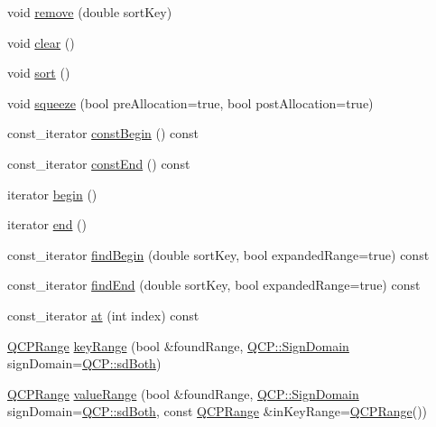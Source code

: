 \begin{DoxyCompactItemize}
\item 
void \hyperlink{class_q_c_p_data_container_a2dbded7f0732bacf9db48fdfbbb620bc}{remove} (double sort\+Key)
\item 
void \hyperlink{class_q_c_p_data_container_a7e2b29736c6fd761649bda1a54ba967f}{clear} ()
\item 
void \hyperlink{class_q_c_p_data_container_a75da92e33063b63d6da5014683591d45}{sort} ()
\item 
void \hyperlink{class_q_c_p_data_container_a82fcc511def22287fc62579d0706387c}{squeeze} (bool pre\+Allocation=true, bool post\+Allocation=true)
\item 
const\+\_\+iterator \hyperlink{class_q_c_p_data_container_a49d7622999e2de67fa2331626a3159aa}{const\+Begin} () const
\item 
const\+\_\+iterator \hyperlink{class_q_c_p_data_container_aa7f7cf239b85b1a28de3d675cc5b3da1}{const\+End} () const
\item 
iterator \hyperlink{class_q_c_p_data_container_a80032518413ab8f418f7c81182fd06cb}{begin} ()
\item 
iterator \hyperlink{class_q_c_p_data_container_acf66dfad83fe041380f5e0491e7676f2}{end} ()
\item 
const\+\_\+iterator \hyperlink{class_q_c_p_data_container_a2ad8a5399072d99a242d3a6d2d7e278a}{find\+Begin} (double sort\+Key, bool expanded\+Range=true) const
\item 
const\+\_\+iterator \hyperlink{class_q_c_p_data_container_afb8b8f23cc2b7234a793a25ce79fe48f}{find\+End} (double sort\+Key, bool expanded\+Range=true) const
\item 
const\+\_\+iterator \hyperlink{class_q_c_p_data_container_ae90c7457a052b223539906e6bddc0a92}{at} (int index) const
\item 
\hyperlink{class_q_c_p_range}{Q\+C\+P\+Range} \hyperlink{class_q_c_p_data_container_aba6e1a93c21ccc56a432b4a02c9d0ed2}{key\+Range} (bool \&found\+Range, \hyperlink{namespace_q_c_p_afd50e7cf431af385614987d8553ff8a9}{Q\+C\+P\+::\+Sign\+Domain} sign\+Domain=\hyperlink{namespace_q_c_p_afd50e7cf431af385614987d8553ff8a9aa38352ef02d51ddfa4399d9551566e24}{Q\+C\+P\+::sd\+Both})
\item 
\hyperlink{class_q_c_p_range}{Q\+C\+P\+Range} \hyperlink{class_q_c_p_data_container_a35a102dc2424d1228fc374d9313efbe9}{value\+Range} (bool \&found\+Range, \hyperlink{namespace_q_c_p_afd50e7cf431af385614987d8553ff8a9}{Q\+C\+P\+::\+Sign\+Domain} sign\+Domain=\hyperlink{namespace_q_c_p_afd50e7cf431af385614987d8553ff8a9aa38352ef02d51ddfa4399d9551566e24}{Q\+C\+P\+::sd\+Both}, const \hyperlink{class_q_c_p_range}{Q\+C\+P\+Range} \&in\+Key\+Range=\hyperlink{class_q_c_p_range}{Q\+C\+P\+Range}())

\end{DoxyCompactItemize}
